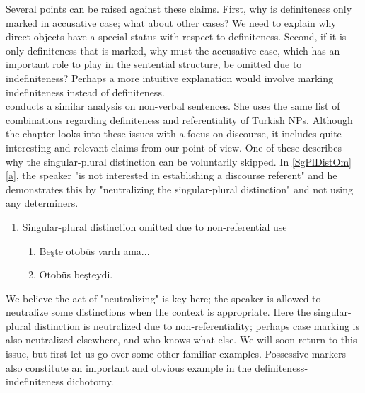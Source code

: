 \documentclass[11pt]{article} %
\begin{document}
Several points can be raised against these claims. First, why is definiteness only marked in accusative case; what about other cases? We need to explain why direct objects have a special status with respect to definiteness. Second, if it is only definiteness that is marked, why must the accusative case, which has an important role to play in the sentential structure, be omitted due to indefiniteness? Perhaps a more intuitive explanation would involve marking indefiniteness instead of definiteness. \\

\citet{Tura1986} conducts a similar analysis on non-verbal sentences. She uses the same list of combinations regarding definiteness and referentiality of Turkish NPs. Although the chapter looks into these issues with a focus on discourse, it includes quite interesting and relevant claims from our point of view. One of these describes why the singular-plural distinction can be voluntarily skipped. In \ref{SgPlDistOm} \ref{a}, the speaker "is not interested in establishing a discourse referent" and he demonstrates this by "neutralizing the singular-plural distinction" and not using any determiners. 

\begin{enumerate}[resume*] 
	\item Singular-plural distinction omitted due to non-referential use \label{SgPlDistOm}
	\begin{enumerate}[label=(\alph*), ref=(\alph*)]\itemsep1pt
	\item Beşte otobüs vardı ama... \label{a}
	\item Otobüs beşteydi. \label{b}
	\end{enumerate}
\end{enumerate}

We believe the act of "neutralizing" is key here; the speaker is allowed to neutralize some distinctions when the context is appropriate. Here the singular-plural distinction is neutralized due to non-referentiality; perhaps case marking is also neutralized elsewhere, and who knows what else. We will soon return to this issue, but first let us go over some other familiar examples. Possessive markers also constitute an important and obvious example in the definiteness-indefiniteness dichotomy. 
\end{document}
